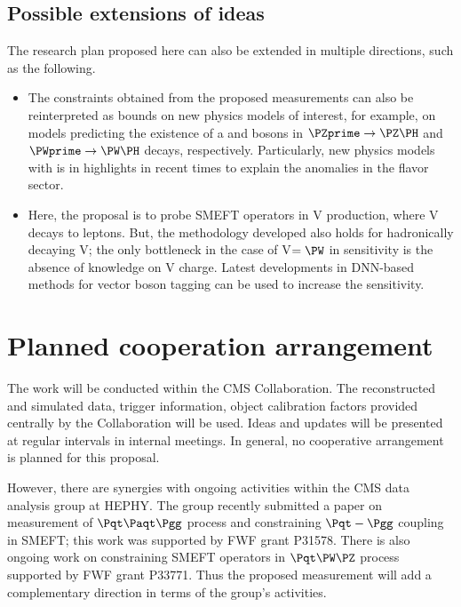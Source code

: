 \documentclass[a4paper,11pt]{article}
\newcommand{\Pt}{{{\Pqt}}\xspace}
\newcommand{\PAt}{{{{\Paqt}}}\xspace}
\renewcommand{\PV}{{{{V}}}\xspace}
\newcommand{\VH}{{{\PV}{\PH}}\xspace}
\begin{document}
\subsection{Possible extensions of ideas}

The research plan proposed here can also be extended in multiple directions, such as the following. 

\begin{itemize}

\item The constraints obtained from  the proposed measurements can also be reinterpreted as bounds on new physics models of interest, for example, on models predicting the existence of a \PZprime and \PWprime bosons in $\PZprime \to \PZ \PH$ and $\PWprime \to \PW \PH$ decays, respectively.
Particularly, new physics models with \PZprime is in highlights in recent times to explain the anomalies in the flavor sector. 

\item Here, the proposal is to probe SMEFT operators in \VH production, where \PV decays to leptons. 
But, the methodology developed also holds for hadronically decaying \PV; 
the only bottleneck in the case of {\PV}$ ={\PW}$ in sensitivity is the absence of knowledge on \PV charge. 
Latest developments in DNN-based methods for vector boson tagging can be used to increase the sensitivity. 

\end{itemize}


\section{Planned cooperation arrangement} 

The work will be conducted within the CMS Collaboration. The reconstructed and simulated data, trigger information, object calibration factors provided centrally by the Collaboration will be used. 
Ideas and updates will be presented at regular intervals in internal meetings. 
In general, no cooperative arrangement is planned for this proposal. 

However, there are synergies with ongoing activities within the CMS data analysis group at HEPHY. 
The group recently submitted a paper on measurement of $\Pt\PAt\Pgg$ process and constraining $\Pt-\Pgg$ coupling in SMEFT; this work was supported by FWF grant P31578.
There is also ongoing work on constraining SMEFT operators in $\Pt\PW\PZ$ process supported by FWF grant P33771. 
Thus the proposed measurement will add a complementary direction in terms of the group's activities.
\end{document}
